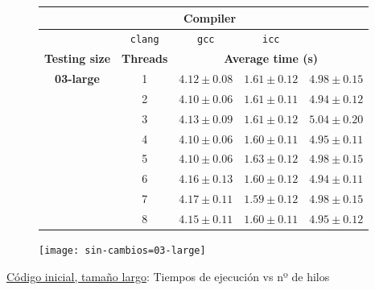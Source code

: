 \begin{figure}[H]
    \centering
    \begin{subfigure}{0.4\textwidth}
        \begin{adjustbox}{width=\textwidth} 
        \begin{tabular}{|c|c|c|c|c|}
            \hline
            \rowcolor{azul} \multicolumn{2}{|c|}{}&\multicolumn{3}{c|}{\textbf{Compiler}} \\ \hline
            \rowcolor{azul} \multicolumn{2}{|c|}{}&\texttt{clang}&\texttt{gcc}&\texttt{icc}\\ \hline
            \rowcolor{azul} \textbf{Testing size} & \textbf{Threads}&\multicolumn{3}{c|}{\textbf{Average time (s)}} \\ \hline
            \multirow{8}{1cm}{\textbf{03-large}} & 1 & \(4.12\pm{0.08}\) & \(1.61\pm{0.12}\) & \(4.98\pm{0.15}\) \\ \cline{2-5}
            & 2 & \(4.10\pm{0.06}\) & \(1.61\pm{0.11}\) & \(4.94\pm{0.12}\) \\ \cline{2-5}
            & 3 & \(4.13\pm{0.09}\) & \(1.61\pm{0.12}\) & \(5.04\pm{0.20}\) \\ \cline{2-5}
            & 4 & \(4.10\pm{0.06}\) & \(1.60\pm{0.11}\) & \(4.95\pm{0.11}\) \\ \cline{2-5}
            & 5 & \(4.10\pm{0.06}\) & \(1.63\pm{0.12}\) & \(4.98\pm{0.15}\) \\ \cline{2-5}
            & 6 & \(4.16\pm{0.13}\) & \(1.60\pm{0.12}\) & \(4.94\pm{0.11}\) \\ \cline{2-5}
            & 7 & \(4.17\pm{0.11}\) & \(1.59\pm{0.12}\) & \(4.98\pm{0.15}\) \\ \cline{2-5}
            & 8 & \(4.15\pm{0.11}\) & \(1.60\pm{0.11}\) & \(4.95\pm{0.12}\) \\ \hline
        \end{tabular}
        \end{adjustbox}
    \end{subfigure}
    \hfill
    \begin{subfigure}{0.5\textwidth}
        \texttt{[image: sin-cambios=03-large]}
    \end{subfigure}
    \caption{\underline{Código inicial, tamaño largo}: Tiempos de ejecución vs nº de hilos}
    \label{sin-cambios=03-large}
\end{figure}
